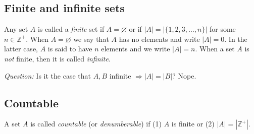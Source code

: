 \documentclass[11pt]{article}
\let\emptyset\varnothing
\begin{document}
    \subsection{Finite and infinite sets}

    Any set $A$ is called a \emph{finite} set if \(A = \emptyset\) or if \(|A| = |\{1,2,3,\dots,n\}|\) for some \(n \in \mathbb{Z}^+\). When \(A = \emptyset\) we say that $A$ has no elements and write \(|A| = 0\). In the latter case, $A$ is said to have $n$ elements and we write \(|A| = n\). When a set $A$ is \emph{not} finite, then it is called \emph{infinite}.

    \vspace{1em}

    \emph{Question:} Is it the case that \(A,B\) infinite \(\Rightarrow |A| = |B|?\) Nope.

    \subsection{Countable}

    A set $A$ is called \emph{countable} (or \emph{denumberable}) if (1) $A$ is finite or (2) \(|A| = |\mathbb{Z}^+|.\)

    \vspace{1em}
\end{document}
